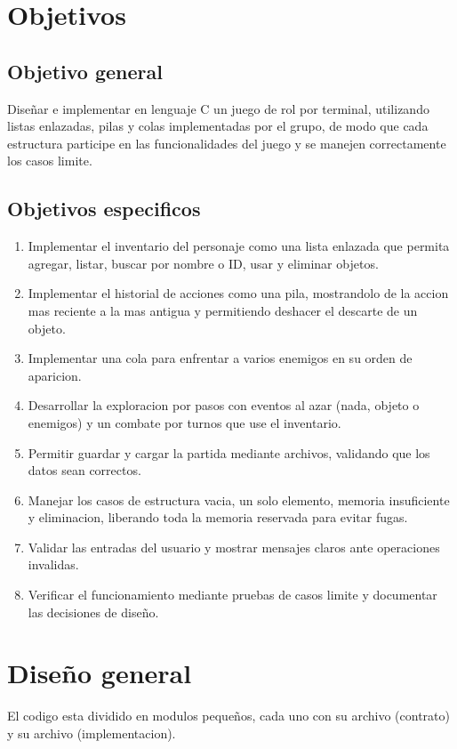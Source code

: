 \documentclass[11pt,a4paper]{article}
\newcommand{\fn}[1]{\texttt{\detokenize{#1}}}
\begin{document}
\section{Objetivos}

\subsection{Objetivo general}
Diseñar e implementar en lenguaje C un juego de rol por terminal, utilizando listas
enlazadas, pilas y colas implementadas por el grupo, de modo que cada estructura
participe en las funcionalidades del juego y se manejen correctamente los casos
limite.

\subsection{Objetivos especificos}
\begin{enumerate}
  \item Implementar el inventario del personaje como una lista enlazada que permita agregar,
        listar, buscar por nombre o ID, usar y eliminar objetos.
  \item Implementar el historial de acciones como una pila, mostrandolo de la accion mas reciente
        a la mas antigua y permitiendo deshacer el descarte de un objeto.
  \item Implementar una cola para enfrentar a varios enemigos en su orden de aparicion.
  \item Desarrollar la exploracion por pasos con eventos al azar (nada, objeto o enemigos) y un combate
        por turnos que use el inventario.
  \item Permitir guardar y cargar la partida mediante archivos, validando que los datos sean correctos.
  \item Manejar los casos de estructura vacia, un solo elemento, memoria insuficiente y eliminacion,
        liberando toda la memoria reservada para evitar fugas.
  \item Validar las entradas del usuario y mostrar mensajes claros ante operaciones invalidas.
  \item Verificar el funcionamiento mediante pruebas de casos limite y documentar las decisiones de diseño.
\end{enumerate}

\section{Diseño general}
El codigo esta dividido en modulos pequeños, cada uno con su archivo \fn{.h}
(contrato) y su archivo \fn{.c} (implementacion).
\end{document}
